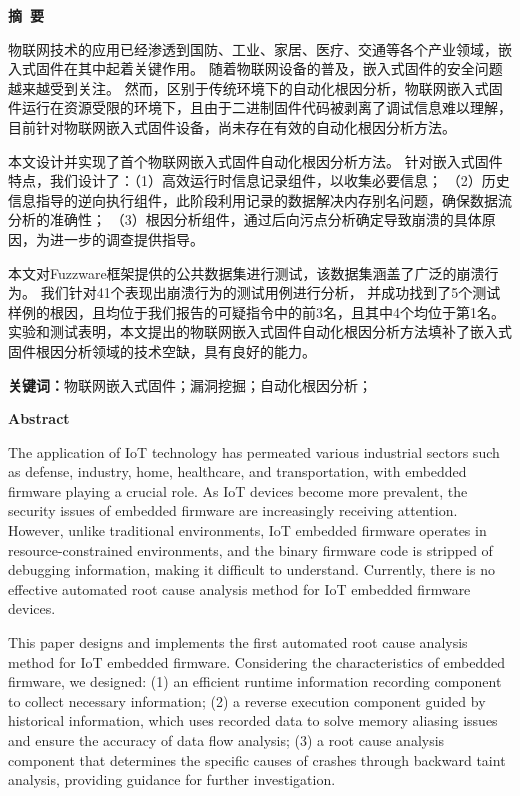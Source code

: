 \cleardoublepage{}
\begin{center}
    \bfseries {} 摘~要
\end{center}

物联网技术的应用已经渗透到国防、工业、家居、医疗、交通等各个产业领域，嵌入式固件在其中起着关键作用。
随着物联网设备的普及，嵌入式固件的安全问题越来越受到关注。
然而，区别于传统环境下的自动化根因分析，物联网嵌入式固件运行在资源受限的环境下，且由于二进制固件代码被剥离了调试信息难以理解，
目前针对物联网嵌入式固件设备，尚未存在有效的自动化根因分析方法。

本文设计并实现了首个物联网嵌入式固件自动化根因分析方法。
针对嵌入式固件特点，我们设计了：（1）高效运行时信息记录组件，以收集必要信息；
（2）历史信息指导的逆向执行组件，此阶段利用记录的数据解决内存别名问题，确保数据流分析的准确性；
（3）根因分析组件，通过后向污点分析确定导致崩溃的具体原因，为进一步的调查提供指导。

本文对Fuzzware框架提供的公共数据集进行测试，该数据集涵盖了广泛的崩溃行为。
我们针对41个表现出崩溃行为的测试用例进行分析，
并成功找到了5个测试样例的根因，且均位于我们报告的可疑指令中的前3名，且其中4个均位于第1名。
实验和测试表明，本文提出的物联网嵌入式固件自动化根因分析方法填补了嵌入式固件根因分析领域的技术空缺，具有良好的能力。


\textbf{关键词：}物联网嵌入式固件；漏洞挖掘；自动化根因分析；

\cleardoublepage{}
\begin{center}
    \bfseries {} Abstract
\end{center}

The application of IoT technology has permeated various industrial sectors such as defense, industry, home, healthcare, and transportation, with embedded firmware playing a crucial role. As IoT devices become more prevalent, the security issues of embedded firmware are increasingly receiving attention. However, unlike traditional environments, IoT embedded firmware operates in resource-constrained environments, and the binary firmware code is stripped of debugging information, making it difficult to understand. Currently, there is no effective automated root cause analysis method for IoT embedded firmware devices.

This paper designs and implements the first automated root cause analysis method for IoT embedded firmware. Considering the characteristics of embedded firmware, we designed: (1) an efficient runtime information recording component to collect necessary information; (2) a reverse execution component guided by historical information, which uses recorded data to solve memory aliasing issues and ensure the accuracy of data flow analysis; (3) a root cause analysis component that determines the specific causes of crashes through backward taint analysis, providing guidance for further investigation.

